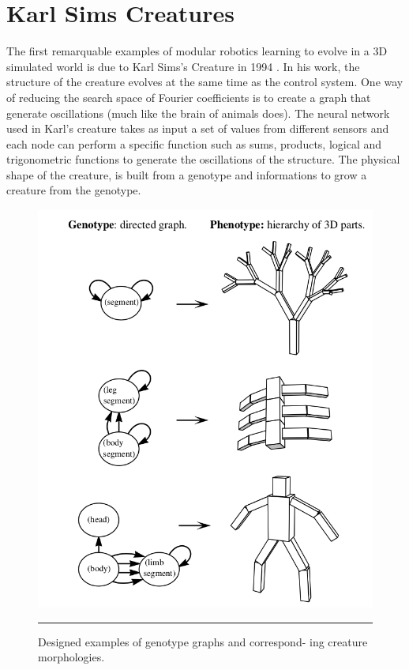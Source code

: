 \section{Karl Sims Creatures}
The first remarquable examples of modular robotics learning to evolve in a 3D simulated world is due to Karl Sims's Creature in 1994 \cite{karl}. In his work, the structure of the creature evolves at the same time as the control system. One way of reducing the search space of Fourier coefficients is to create a graph that generate oscillations (much like the brain of animals does). The neural network used in Karl's creature takes as input a set of values from different sensors and each node can perform a specific function such as sums, products, logical and trigonometric functions to generate the oscillations of the structure. The physical shape of the creature, is built from a genotype and informations to grow a creature from the genotype.   
 
\begin{figure}[htbp]
    \centering
    \includegraphics[scale=0.3]{Figures/sims_genotype.png}
    \rule{35em}{0.5pt}
    \caption[Designed examples of genotype graphs and correspond-
    ing creature morphologies.]{Designed examples of genotype graphs and correspond-
    ing creature morphologies.}
    \label{fig:sims_genotype}
\end{figure}

